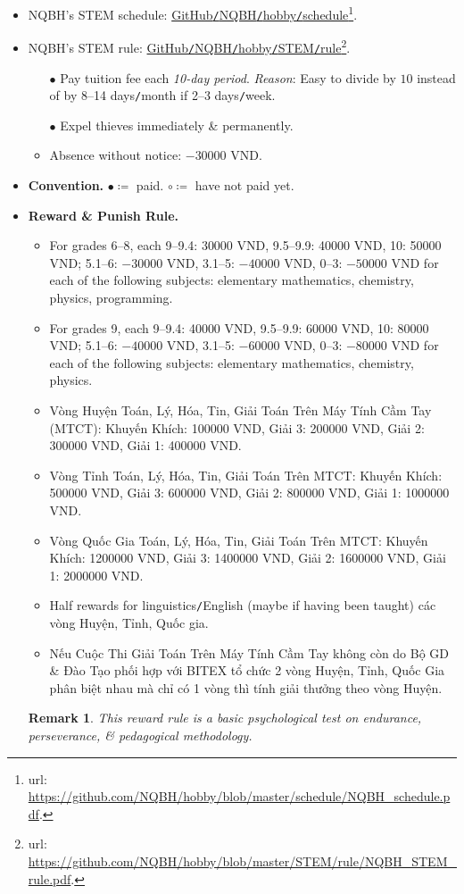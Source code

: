 \documentclass{article}
\newtheorem{remark}{Remark}
\begin{document}
\begin{itemize}
	\item NQBH's STEM schedule: \href{https://github.com/NQBH/hobby/blob/master/schedule/NQBH_schedule.pdf}{GitHub\texttt{/}NQBH\texttt{/}hobby\texttt{/}schedule}\footnote{{\sc url}: \url{https://github.com/NQBH/hobby/blob/master/schedule/NQBH_schedule.pdf}.}.
	\item NQBH's STEM rule: \href{https://github.com/NQBH/hobby/blob/master/STEM/rule/NQBH_STEM_rule.pdf}{GitHub\texttt{/}NQBH\texttt{/}hobby\texttt{/}STEM\texttt{/}rule}\footnote{{\sc url}: \url{https://github.com/NQBH/hobby/blob/master/STEM/rule/NQBH_STEM_rule.pdf}.}.
	\begin{itemize}
		\item[$\bullet$] Pay tuition fee each \textit{10-day period}. \textit{Reason}: Easy to divide by $10$ instead of by 8--14 days\texttt{/}month if 2--3 days\texttt{/}week.
		\item[$\bullet$] Expel thieves immediately \& permanently.
		\item Absence without notice: $-30000$ VND.
	\end{itemize}
	\item \textbf{Convention.} $\bullet\coloneq$ paid. $\circ\coloneq$ have not paid yet.
	\item \textbf{Reward \& Punish Rule.}
	\begin{itemize}
		\item For grades 6--8, each 9--9.4: 30000 VND, 9.5--9.9: 40000 VND, 10: 50000 VND; 5.1--6: $-30000$ VND, 3.1--5: $-40000$ VND, 0--3: $-50000$ VND for each of the following subjects: elementary mathematics, chemistry, physics, programming.
		\item For grades 9, each 9--9.4: 40000 VND, 9.5--9.9: 60000 VND, 10: 80000 VND; 5.1--6: $-40000$ VND, 3.1--5: $-60000$ VND, 0--3: $-80000$ VND for each of the following subjects: elementary mathematics, chemistry, physics.
		\item Vòng Huyện Toán, Lý, Hóa, Tin, Giải Toán Trên Máy Tính Cầm Tay (MTCT): Khuyến Khích: 100000 VND, Giải 3: 200000 VND, Giải 2: 300000 VND, Giải 1: 400000 VND.
		\item Vòng Tỉnh Toán, Lý, Hóa, Tin, Giải Toán Trên MTCT: Khuyến Khích: 500000 VND, Giải 3: 600000 VND, Giải 2: 800000 VND, Giải 1: 1000000 VND.
		\item Vòng Quốc Gia Toán, Lý, Hóa, Tin, Giải Toán Trên MTCT: Khuyến Khích: 1200000 VND, Giải 3: 1400000 VND, Giải 2: 1600000 VND, Giải 1: 2000000 VND.
		\item Half rewards for linguistics\texttt{/}English (maybe if having been taught) các vòng Huyện, Tỉnh, Quốc gia.
		\item Nếu Cuộc Thi Giải Toán Trên Máy Tính Cầm Tay không còn do Bộ GD \& Đào Tạo phối hợp với BITEX tổ chức 2 vòng Huyện, Tỉnh, Quốc Gia phân biệt nhau mà chỉ có 1 vòng thì tính giải thưởng theo vòng Huyện.
	\end{itemize}
		 
	\begin{remark}
		This reward rule is a basic psychological test on endurance, perseverance, \& pedagogical methodology.
	\end{remark}
\end{itemize}
\end{document}
